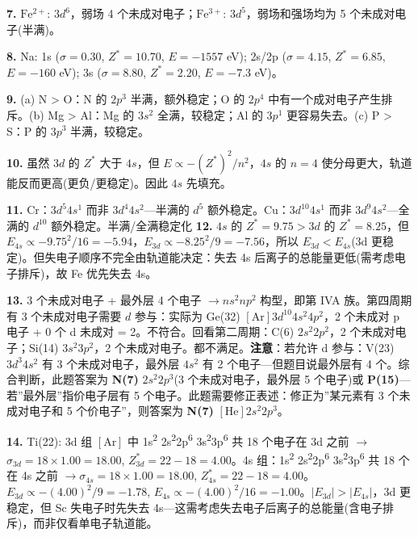 \documentclass[a4paper,11pt]{ctexart}
\newcommand{\箭}{\ensuremath{\rightarrow}}
\newcommand{\左箭}{\ensuremath{\leftarrow}}
\newcommand{\上箭}{\ensuremath{\uparrow}}
\newcommand{\下箭}{\ensuremath{\downarrow}}
\newcommand{\衡}{\ensuremath{\rightleftharpoons}}
\newcommand{\双箭}{\ensuremath{\leftrightarrow}}
\newcommand{\约等于}{\ensuremath{\approx}}
\newcommand{\小于等于}{\ensuremath{\leq}}
\newcommand{\大于等于}{\ensuremath{\geq}}
\newcommand{\不等于}{\ensuremath{\neq}}
\newcommand{\西格马}{\ensuremath{\sigma}}
\newcommand{\派}{\ensuremath{\pi}}
\begin{document}
\textbf{7.} \(\mathrm{Fe^{2+}}\): \(3d^6\)，弱场 4 个未成对电子；\(\mathrm{Fe^{3+}}\): \(3d^5\)，弱场和强场均为 5 个未成对电子(半满)。

\textbf{8.} Na: 1s (\(\sigma=0.30\), \(Z^*=10.70\), \(E=-1557\) eV); 2s/2p (\(\sigma=4.15\), \(Z^*=6.85\), \(E=-160\) eV); 3s (\(\sigma=8.80\), \(Z^*=2.20\), \(E=-7.3\) eV)。

\textbf{9.} (a) N \textgreater{} O：N 的 \(2p^3\) 半满，额外稳定；O 的 \(2p^4\) 中有一个成对电子产生排斥。(b) Mg \textgreater{} Al：Mg 的 \(3s^2\) 全满，较稳定；Al 的 \(3p^1\) 更容易失去。(c) P \textgreater{} S：P 的 \(3p^3\) 半满，较稳定。

\textbf{10.} 虽然 \(3d\) 的 \(Z^*\) 大于 \(4s\)，但 \(E \propto -(Z^*)^2/n^2\)，\(4s\) 的 \(n=4\) 使分母更大，轨道能反而更高(更负/更稳定)。因此 \(4s\) 先填充。

\textbf{11.} Cr：\(3d^5 4s^1\) 而非 \(3d^4 4s^2\)---半满的 \(d^5\) 额外稳定。Cu：\(3d^{10} 4s^1\) 而非 \(3d^9 4s^2\)---全满的 \(d^{10}\) 额外稳定。半满/全满稳定化
\textbf{12.} \(4s\) 的 \(Z^*=9.75 > 3d\) 的 \(Z^*=8.25\)，但 \(E_{4s} \propto -9.75^2/16 = -5.94\)，\(E_{3d} \propto -8.25^2/9 = -7.56\)，所以 \(E_{3d} < E_{4s}\)(3d 更稳定)。但失电子顺序不完全由轨道能决定：失去 4s 后离子的总能量更低(需考虑电子排斥)，故 Fe 优先失去 4s。

\textbf{13.} 3 个未成对电子 + 最外层 4 个电子 \箭 \(ns^2 np^2\) 构型，即第 IVA 族。第四周期有 3 个未成对电子需要 \(d\) 参与：实际为 Ge(32) \([\mathrm{Ar}]3d^{10}4s^2 4p^2\)，2 个未成对 p 电子 + 0 个 d 未成对 = 2。不符合。回看第二周期：C(6) \(2s^2 2p^2\)，2 个未成对电子；Si(14) \(3s^2 3p^2\)，2 个未成对电子。都不满足。\textbf{注意}：若允许 d 参与：V(23) \(3d^3 4s^2\) 有 3 个未成对电子，最外层 \(4s^2\) 有 2 个电子---但题目说最外层有 4 个。综合判断，此题答案为 \textbf{N(7)} \(2s^2 2p^3\)(3 个未成对电子，最外层 5 个电子)或 \textbf{P(15)}---若''最外层''指价电子层有 5 个电子。此题需要修正表述：修正为''某元素有 3 个未成对电子和 5 个价电子''，则答案为 \textbf{N(7)} \([\mathrm{He}]2s^2 2p^3\)。

\textbf{14.} Ti(22): 3d 组 \([\mathrm{Ar}]\) 中 1s\textsuperscript{2} 2s\textsuperscript{2}2p\textsuperscript{6} 3s\textsuperscript{2}3p\textsuperscript{6} 共 18 个电子在 3d 之前 \箭 \(\sigma_{3d} = 18 \times 1.00 = 18.00\), \(Z^*_{3d} = 22 - 18 = 4.00\)。4s 组：1s\textsuperscript{2} 2s\textsuperscript{2}2p\textsuperscript{6} 3s\textsuperscript{2}3p\textsuperscript{6} 共 18 个在 4s 之前 \箭 \(\sigma_{4s} = 18 \times 1.00 = 18.00\), \(Z^*_{4s} = 22 - 18 = 4.00\)。\(E_{3d} \propto -(4.00)^2/9 = -1.78\), \(E_{4s} \propto -(4.00)^2/16 = -1.00\)。\(|E_{3d}| > |E_{4s}|\)，3d 更稳定，但 Sc 失电子时先失去 4s---这需考虑失去电子后离子的总能量(含电子排斥)，而非仅看单电子轨道能。
\end{document}
